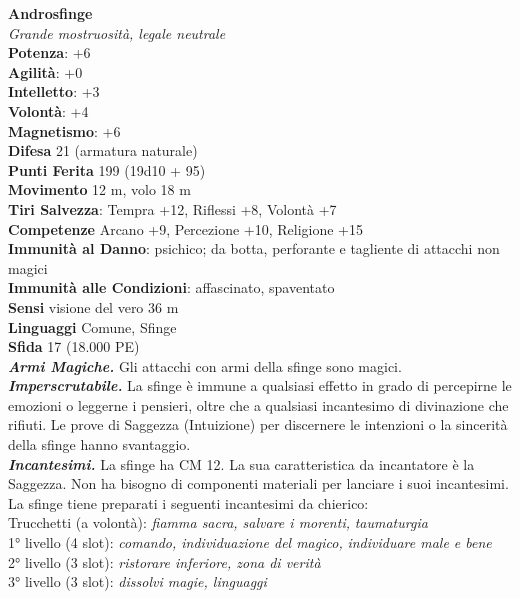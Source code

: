 \begin{multicols}{2}
\medskip\textbf{Androsfinge}\\
\emph{Grande mostruosità, legale neutrale}\\
\textbf{Potenza}: +6\\
\textbf{Agilità}: +0\\
\textbf{Intelletto}: +3\\
\textbf{Volontà}: +4\\
\textbf{Magnetismo}: +6\\
\textbf{Difesa} 21 (armatura naturale)\\
\textbf{Punti Ferita} 199 (19d10 + 95)\\
\textbf{Movimento} 12 m, volo 18 m\\
\textbf{Tiri Salvezza}: Tempra +12, Riflessi +8, Volontà +7\\
\textbf{Competenze} Arcano +9, Percezione +10, Religione +15\\
\textbf{Immunità al Danno}: psichico; da botta, perforante e tagliente di attacchi non magici\\
\textbf{Immunità alle Condizioni}: affascinato, spaventato\\
\textbf{Sensi} visione del vero 36 m\\
\textbf{Linguaggi} Comune, Sfinge\\
\textbf{Sfida} 17 (18.000 PE)\smallskip\\
\emph{\textbf{Armi Magiche.}} Gli attacchi con armi della sfinge sono magici.\\
\emph{\textbf{Imperscrutabile.}} La sfinge è immune a qualsiasi effetto in grado di percepirne le emozioni o leggerne i pensieri, oltre che a qualsiasi incantesimo di divinazione che rifiuti. Le prove di Saggezza (Intuizione) per discernere le intenzioni o la sincerità della sfinge hanno svantaggio.\\
\emph{\textbf{Incantesimi.}} La sfinge ha CM 12. La sua caratteristica da incantatore è la Saggezza. Non ha bisogno di componenti materiali per lanciare i suoi incantesimi. La sfinge tiene preparati i seguenti incantesimi da chierico:\\
Trucchetti (a volontà): \emph{fiamma sacra, salvare i morenti,} \emph{taumaturgia}\\
1° livello (4 slot): \emph{comando, individuazione del magico,} \emph{individuare male e bene}\\
2° livello (3 slot): \emph{ristorare inferiore, zona di verità}\\
3° livello (3 slot): \emph{dissolvi magie, linguaggi}\\

\end{multicols}
